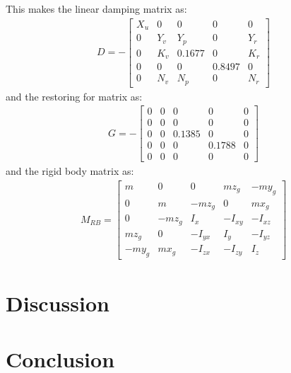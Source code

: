 This makes the linear damping matrix as:
\begin{align}
D = -
\begin{bmatrix}
X_u & 0 & 0 & 0 & 0\\
0 & Y_v & Y_p & 0 & Y_r\\
0 & K_v & 0.1677 & 0 & K_r\\
0 & 0 & 0 & 0.8497 & 0\\
0 & N_v & N_p & 0 & N_r
\end{bmatrix}
\end{align}
and the restoring for matrix as:
\begin{align}
G = -
\begin{bmatrix}
0 & 0 & 0 & 0 & 0\\
0 & 0 & 0 & 0 & 0\\
0 & 0 & 0.1385 & 0 & 0\\
0 & 0 & 0 & 0.1788 & 0\\
0 & 0 & 0 & 0 & 0
\end{bmatrix}
\end{align}
and the rigid body matrix as:
\begin{align}
M_{RB} =
\begin{bmatrix}
m & 0 & 0 & mz_g & -my_g\\
0 & m & -mz_g & 0 & mx_g\\
0 & -mz_g & I_x & -I_{xy} & -I_{xz}\\
mz_g & 0 & -I_{yx} & I_y & -I_{yz}\\
-my_g & mx_g & -I_{zx} & -I_{zy} & I_z
\end{bmatrix}
\end{align}
\section{Discussion}


\section{Conclusion}

